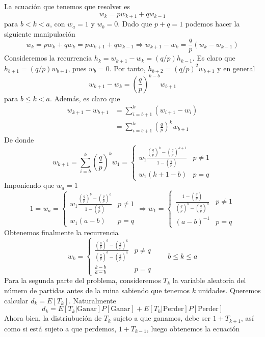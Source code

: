 \documentclass[twoside]{article}
\begin{document}
\begin{solucion}
La ecuación que tenemos que resolver es
$$
w_k = pw_{k+1} + qw_{k-1} 
$$
para $b<k<a$, con $w_a =1$ y $w_b = 0$. Dado que $p+q=1$ podemos hacer la siguiente manipulación
$$
w_k = pw_k  + qw_k = pw_{k+1} + qw_{k-1}  \Rightarrow w_{k+1}-w_k = \frac{q}{p}(w_k - w_{k-1})	
$$
Consideremos la recurrencia $h_k = w_{k+1}-w_{k} = (q/p)h_{k-1}$. Es claro que $h_{b+1} = (q/p)w_{b+1}$, pues $w_b=0$. Por tanto, $h_{b+2} = (q/p)^2w_{b+1}$ y en general
$$
w_{k+1}-w_k = \left(\frac{q}{p}\right)^{k-b} w_{b+1}
$$
para $b\leq k<a$.
Además, es claro que
\begin{align*}
w_{k+1}-w_{b+1} &= \sum_{i=b+1}^k (w_{i+1}-w_i) \\
& = \sum_{i=b+1}^k \left(\frac{q}{p}\right)^k w_{b+1}
\end{align*}
De donde
$$
w_{k+1}  = \sum_{i=b}^k \left(\frac{q}{p}\right)^k w_{1}
= \begin{cases}
w_1 \frac{\left(\frac{q}{p}\right)^{b}-\left(\frac{q}{p}\right)^{k+1}}{1-\left(\frac{q}{p}\right)} & p \neq 1\\
w_1 (k+1-b) & p=q
\end{cases}
$$
Imponiendo que $w_a = 1$ 
$$
1 = w_a = \begin{cases}
w_1 \frac{\left(\frac{q}{p}\right)^{b}-\left(\frac{q}{p}\right)^{a}}{1-\left(\frac{q}{p}\right)} & p \neq 1\\
w_1(a-b) & p=q
\end{cases} \Rightarrow w_1 = \begin{cases}
 \frac{1-\left(\frac{q}{p}\right)}{\left(\frac{q}{p}\right)^{b}-\left(\frac{q}{p}\right)^{a}} & p \neq 1\\
(a-b)^{-1} & p=q
\end{cases}
$$
Obtenemos finalmente la recurrencia
$$
w_k = \begin{cases}
 \frac{\left(\frac{q}{p}\right)^{b}-\left(\frac{q}{p}\right)^k}{\left(\frac{q}{p}\right)^{b}-\left(\frac{q}{p}\right)^{a}} & p \neq q\\
\frac{k-b}{a-b} & p=q
\end{cases} \qquad b\leq k\leq a
$$
\newpage
Para la segunda parte del problema, consideremos $T_k$ la variable aleatoria del número de partidas antes de la ruina sabiendo que tenemos $k$ unidades. Queremos calcular $d_k = E[T_k]$. Naturalmente
$$d_k=E[T_k|\text{Ganar}]P[\text{Ganar}]+E[T_k|\text{Perder}]P[\text{Perder}]$$
Ahora bien, la distriubución de $T_k$ sujeto a que ganamos, debe ser $1+T_{k+1}$, así como si está sujeto a que perdemos, $1+T_{k-1}$, luego obtenemos la ecuación

\end{solucion}
\end{document}
